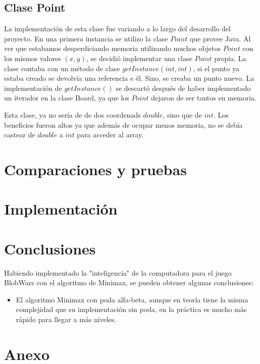 \documentclass[10pt,a4paper,notitlepage,draft]{article}
\begin{document}
  \subsection{Clase Point}
    La implementación de esta clase fue variando a lo largo del desarrollo del proyecto. En una primera instancia se utilizo la clase $Point$ que provee Java.
    Al ver que estabamos desperdiciando memoria utilizando muchos objetos $Point$ con los mismos valores $(x, y)$, se decidió implementar una clase $Point$ propia.
    La clase contaba con un método de clase $getInstance(int, int)$, si el punto ya estaba creado se devolvía una referencia e él. Sino, se creaba un punto nuevo.
    La implementación de $getInstance()$ se descartó después de haber implementado un iterador en la clase Board, ya que los $Point$ dejaron de ser tantos en memoria.

    Esta clase, ya no sería de de dos coordenads $double$, sino que de $int$. Los beneficios fueron altos ya que además de ocupar menos memoria, no se debía castear de $double$ a $int$ para acceder al array.







\section{Comparaciones y pruebas}
\section{Implementación}
\section{Conclusiones}
Habiendo implementado la "inteligencia" de la computadora para el juego BlobWars con el algoritmo de Minimax, se pueden obtener algunas conclusiones:
  \begin{itemize}
    \item
      El algoritmo Minimax con poda alfa-beta, aunque en teoría tiene la misma complejidad que su implementación sin poda,
      en la práctica es mucho más rápido para llegar a más niveles.
   \end{itemize}


\section{Anexo}
\end{document}
